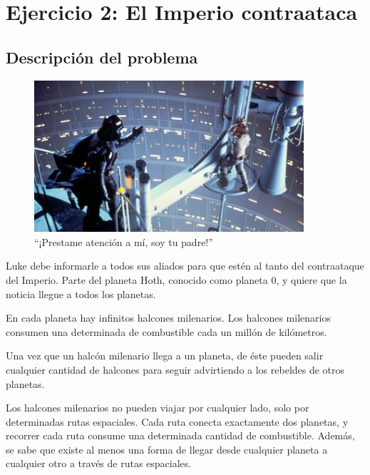 \section{Ejercicio 2: El Imperio contraataca}

    \subsection{Descripción del problema}

    \begin{figure}[ht]
        \begin{center}
            \includegraphics[width=10cm]{imagenes/el_imperio_contraataca.jpg}
            \caption*{``¡Prestame atención a mí, soy tu padre!''}
        \end{center}
    \end{figure}

    Luke debe informarle a todos sus aliados para que estén al tanto del contraataque del Imperio. Parte del planeta Hoth, conocido como planeta 0, y quiere que la noticia llegue a todos los planetas.

    En cada planeta hay infinitos halcones milenarios. Los halcones milenarios consumen una determinada de combustible cada un millón de kilómetros.

    Una vez que un halcón milenario llega a un planeta, de éste pueden salir cualquier cantidad de halcones para seguir advirtiendo a los rebeldes de otros planetas.

    Los halcones milenarios no pueden viajar por cualquier lado, solo por determinadas rutas espaciales. Cada ruta conecta exactamente dos planetas, y recorrer cada ruta consume una determinada cantidad de combustible. Además, se sabe que existe al menos una forma de llegar desde cualquier planeta a cualquier otro a través de rutas espaciales.

